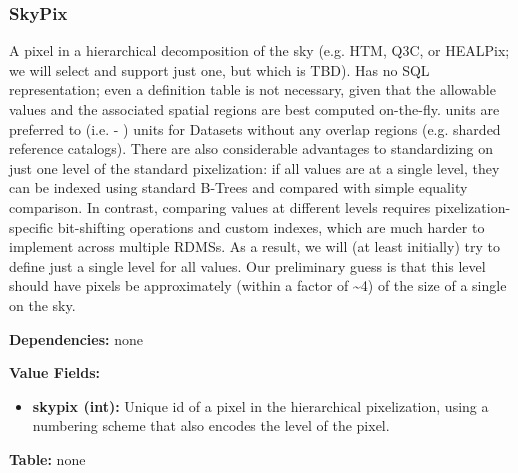 \subsubsection{SkyPix}
\label{unit:SkyPix}

A pixel in a hierarchical decomposition of the sky (e.g. HTM, Q3C, or
HEALPix; we will select and support just one, but which is TBD). Has
no SQL representation; even a definition table is not necessary, given
that the allowable values and the associated spatial regions are best
computed on-the-fly.   units are preferred to
 (i.e. - ) units for
Datasets without any overlap regions (e.g. sharded reference
catalogs). There are also considerable advantages to standardizing on
just one level of the standard pixelization: if all 
values are at a single level, they can be indexed using standard
B-Trees and compared with simple equality comparison.  In contrast,
comparing  values at different levels requires
pixelization- specific bit-shifting operations and custom indexes,
which are much harder to implement across multiple RDMSs.  As a
result, we will (at least initially) try to define just a single level
for all  values.  Our preliminary guess is that this
level should have pixels be approximately (within a factor of
\textasciitilde{}4) of the size of a single  on the
sky.

\textbf{Dependencies:} none

\textbf{Value Fields:}
\begin{itemize}
  \item \textbf{skypix (int):}
      Unique id of a pixel in the hierarchical pixelization, using a
      numbering scheme that also encodes the level of the pixel.
\end{itemize}

\textbf{Table:} none
